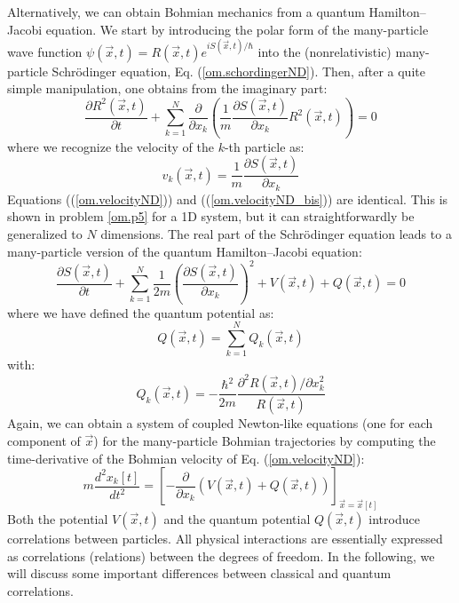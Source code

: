 \documentclass[onecolumn,nofootinbib, secnumarabic, amsmath, nobibnotes,12pt,aps,pra]{revtex4-1}
\newcommand{\pref}[1]{(\ref{#1})}
\newcommand{\eref}[1]{Eq. (\ref{#1})}
\begin{document}
Alternatively, we can obtain Bohmian mechanics from a quantum Hamilton--Jacobi equation. We start by introducing the polar form of the many-particle wave function $\psi(\vec{x},t) = R(\vec{x},t) e^{i S(\vec{x},t)/\hbar}$ into the (nonrelativistic) many-particle Schr\"odinger equation, \eref{om.schordingerND}. Then, after a quite simple manipulation, one obtains from the imaginary part:
\begin{equation}
\label{om.charge_conservationND}
\frac{\partial R^{2}(\vec{x},t)}{\partial t} + \sum_{k = 1}^{N} \frac {\partial } {\partial x_k} \left(\frac {1} {m} \frac {\partial S(\vec{x},t)}{\partial x_k} R^2(\vec{x},t) \right) = 0
\end{equation}
where we recognize the velocity of the $k$-th particle as:
\begin{equation}
\label{om.velocityND_bis}
v_k(\vec{x},t) = \frac {1} {m} \frac {\partial S(\vec{x},t)}{\partial x_k}
\end{equation}
Equations (\pref{om.velocityND}) and (\pref{om.velocityND_bis}) are
identical. This is shown in problem \ref{om.p5} for a 1D system, but
it can straightforwardly be generalized to $N$ dimensions. The real
part of the Schr\"odinger equation leads to a many-particle version
of the quantum Hamilton--Jacobi equation:
\begin{equation}
\label{om.Hamilton_JacobiND}
\frac{\partial S(\vec{x},t)}{\partial t} + \sum_{k = 1}^{N} \frac {1} {2 m} \left(\frac{{\partial} S(\vec{x},t)} {\partial x_k} \right)^2 + V(\vec{x},t) + Q(\vec{x},t) = 0 
\end{equation}
where we have defined the quantum potential as:
\begin{equation}
\label{om.quantum_potentialND_total}
Q(\vec{x},t) = \sum_{k = 1}^{N} Q_k(\vec{x},t)
\end{equation}
with:
\begin{equation}
\label{om.quantum_potentialND_parcial}
Q_k(\vec{x},t) = -\frac{\hbar^2} {2 m} \frac{{\partial}^2 R(\vec{x},t)/ \partial x^2_k} {R(\vec{x},t)}
\end{equation}
Again, we can obtain a system of coupled Newton-like equations (one for each component of $\vec{x}$) for the many-particle Bohmian trajectories by computing the time-derivative of the Bohmian velocity of \eref{om.velocityND}:
\begin{equation}
\label{om.NewtonlikeMP}
m\frac{d^2x_k[t]} {dt^2} = \left [-\frac{\partial} {\partial x_k} \left( V(\vec{x},t) + Q(\vec{x},t)\right)  \right ] _{\vec x = \vec x[t]}
\end{equation}
Both the potential $V(\vec{x},t)$ and the quantum potential
$Q(\vec{x},t)$ introduce correlations between particles. All
physical interactions are essentially expressed as correlations (relations)
between the degrees of freedom. In the following, we will discuss
some important differences between classical and quantum
correlations.
\end{document}

